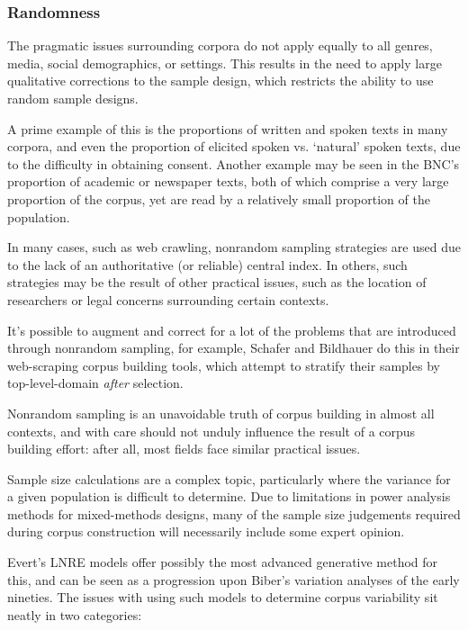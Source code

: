 \subsubsection{Randomness}
The pragmatic issues surrounding corpora do not apply equally to all genres, media, social demographics, or settings.  This results in the need to apply large qualitative corrections to the sample design, which restricts the ability to use random sample designs.

A prime example of this is the proportions of written and spoken texts in many corpora, and even the proportion of elicited spoken vs. `natural' spoken texts, due to the difficulty in obtaining consent.  Another example may be seen in the BNC's proportion of academic or newspaper texts, both of which comprise a very large proportion of the corpus, yet are read by a relatively small proportion of the population.

In many cases, such as web crawling, nonrandom sampling strategies are used due to the lack of an authoritative (or reliable) central index.  In others, such strategies may be the result of other practical issues, such as the location of researchers or legal concerns surrounding certain contexts.

It's possible to augment and correct for a lot of the problems that are introduced through nonrandom sampling, for example, Schafer and Bildhauer do this in their web-scraping corpus building tools, which attempt to stratify their samples by top-level-domain \textsl{after} selection\cite{schafer2014focused}.

Nonrandom sampling is an unavoidable truth of corpus building in almost all contexts, and with care should not unduly influence the result of a corpus building effort: after all, most fields face similar practical issues.

Sample size calculations are a complex topic, particularly where the variance for a given population is difficult to determine.  Due to limitations in power analysis methods for mixed-methods designs, many of the sample size judgements required during corpus construction will necessarily include some expert opinion.

Evert's LNRE models offer possibly the most advanced generative method for this\cite{evert2007zipfr}, and can be seen as a progression upon Biber's variation analyses of the early nineties.  The issues with using such models to determine corpus variability sit neatly in two categories:

